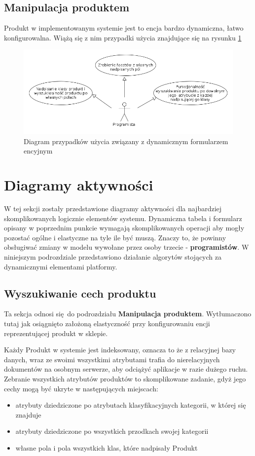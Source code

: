 \subsection{Manipulacja produktem}
Produkt w implementowanym systemie jest to encja bardzo dynamiczna, łatwo konfigurowalna. Wiążą się z nim przypadki użycia znajdujące się na rysunku \ref{manipProd}
\begin{figure}[H]
	\begin{center}
		\includegraphics[scale=0.5]{manipProd.png}
	\end{center}
	\caption{{\color{black}Diagram przypadków użycia związany z dynamicznym formularzem encyjnym}} \label{manipProd}
\end{figure}

\section{Diagramy aktywności}
W tej sekcji zostały przedstawione diagramy aktywności dla najbardziej skomplikowanych logicznie elementów systemu. Dynamiczna tabela i formularz opisany w poprzednim punkcie wymagają skomplikowanych operacji aby mogły pozostać ogólne i elastyczne na tyle ile być muszą. Znaczy to, że powinny obsługiwać zmiany w modelu wywołane przez osoby trzecie - \textbf{programistów}. W niniejszym podrozdziale przedstawiono działanie algorytów stojących za dynamicznymi elementami platformy.

\subsection{Wyszukiwanie cech produktu}
Ta sekcja odnosi się do podrozdziału \textbf{Manipulacja produktem}. Wytłumaczono tutaj jak osiągnięto założoną elastyczność przy konfigurowaniu encji reprezentującej produkt w sklepie. 

Każdy Produkt w systemie jest indeksowany, oznacza to że z relacyjnej bazy danych, wraz ze swoimi wszystkimi atrybutami trafia do nierelacyjnych dokumentów na osobnym serwerze, aby odciążyć aplikacje w razie dużego ruchu. Zebranie wszystkich atrybutów produktów to skomplikowane zadanie, gdyż jego cechy mogą być ukryte w następujących miejscach: 
\begin{itemize}
	\item atrybuty dziedziczone po atrybutach klasyfikacyjnych kategorii, w której się znajduje
	\item atrybuty dziedziczone po wszystkich przodkach swojej kategorii
	\item własne pola i pola wszystkich klas, które nadpisały Produkt 
\end{itemize}  


